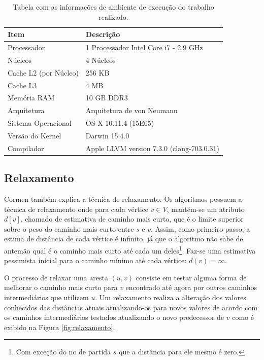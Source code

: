\documentclass[12pt]{article}
\begin{document}
\begin{table}[H]
	\caption{Tabela com as informações de ambiente de execução do trabalho realizado.}
	\centering
    \begin{tabular}{l|l}
    \hline
    \textbf{Item}                & \textbf{Descrição} \\ \hline \hline
    Processador         & 1 Processador Intel Core i7 - 2,9 GHz         \\
    Núcleos             & 4 Núcleos \\
    Cache L2 (por Núcleo) & 256 KB \\
    Cache L3            & 4 MB \\
    Memória RAM         & 10 GB DDR3        \\
    Arquitetura         & Arquitetura de von Neumann         \\
    Sistema Operacional & OS X 10.11.4 (15E65)         \\
    Versão do Kernel    & Darwin 15.4.0 \\
    Compilador          & Apple LLVM version 7.3.0 (clang-703.0.31)         \\\hline
    \end{tabular}
\end{table}

\subsection{Relaxamento}

Cormen \cite{cormen2002algoritmos} também explica a técnica de relaxamento. Os algoritmos possuem a técnica de relaxamento onde para cada vértice $v \in V$, mantém-se um atributo $d[v]$, chamado de estimativa de caminho mais curto, que é o limite superior sobre o peso do caminho mais curto entre $s$ e $v$. Assim, como primeiro passo, a estima de distância de cada vértice é infinito, já que o algoritmo não sabe de antemão qual é o caminho mais curto até cada um deles\footnote{Com exceção do no de partida $s$ que a distância para ele mesmo é zero.}. 
Faz-se uma estimativa pessimista inicial para o caminho mínimo até cada vértice: $d(v)=\infty$.

O processo de relaxar uma aresta $(u,v)$ consiste em testar alguma forma de melhorar o caminho mais curto para $v$ encontrado até agora por outros caminhos intermediários que utilizem $u$. Um relaxamento realiza a alteração dos valores conhecidos das distâncias atuais atualizando-os para novos valores de acordo com os caminhos intermediários testados atualizando o novo predecessor de $v$ como é exibido na Figura \ref{fig:relaxamento}.
\end{document}

